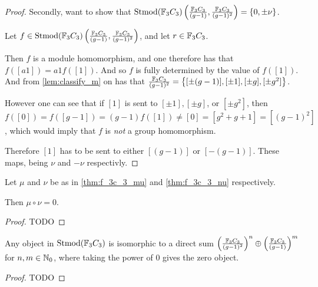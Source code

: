 \begin{proof}
    Secondly, want to show that \( \operatorname{Stmod}({\mathbb{F}}_3C_3)\left(\frac{{\mathbb{F}}_3C_3}{(g - 1)}, \frac{{\mathbb{F}}_3C_3}{(g - 1)^2}\right) = \left\{0, \pm \nu\right\} \).

    Let \( f \in \operatorname{Stmod}({\mathbb{F}}_3C_3)\left(\frac{{\mathbb{F}}_3C_3}{(g - 1)}, \frac{{\mathbb{F}}_3C_3}{(g - 1)^2}\right) \), and let \( r \in {\mathbb{F}}_3C_3 \).
    
    Then \( f \) is a module homomorphism, and one therefore has that \( f([a1]) = a1 f([1]) \). And so \( f \) is fully determined by the value of \( f([1]) \). And from \autoref{lem:classify_m} on has that \( \frac{{\mathbb{F}}_3C_3}{(g - 1)^2} = \left\{[\pm (g - 1)], [\pm 1], [\pm g], [\pm g^2]\right\} \).

    However one can see that if \( [1] \) is sent to \( [\pm 1], [\pm g] \), or \( [\pm g^2] \), then \( f([0]) = f([g - 1]) = (g - 1)f([1]) \neq [0] = [g^2 + g + 1] = [(g - 1)^2] \), which would imply that \( f \) is \emph{not} a group homomorphism.

    Therefore \( [1] \) has to be sent to either \( [(g - 1)] \) or \( [-(g - 1)] \). These maps, being \( \nu \) and \( -\nu \) respectivly.
\end{proof}

\begin{theorem} \label{thm:f_3c_3_mu_circ_nu_zero}
    Let \( \mu \) and \( \nu \) be as in \autoref{thm:f_3c_3_mu} and \autoref{thm:f_3c_3_nu} respectively.

    Then \( \mu \circ \nu = 0 \).
\end{theorem}
\begin{proof}
    TODO
\end{proof}

\begin{theorem} \label{thm:f_3c_3_decomposition}
    Any object in \( \operatorname{Stmod}({\mathbb{F}}_3C_3) \) is isomorphic to a direct sum \( \left( \frac{{\mathbb{F}}_3C_3}{(g - 1)^2} \right)^n \oplus \left( \frac{{\mathbb{F}}_3C_3}{(g - 1)} \right)^m \) for \( n, m \in {\mathbb{N}}_0 \), where taking the power of \( 0 \) gives the zero object. \sloppy
\end{theorem}
\begin{proof}
    TODO
\end{proof}

